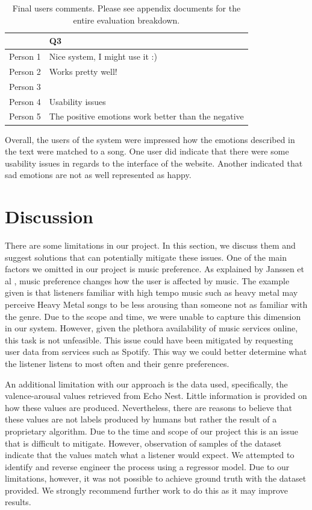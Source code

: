 \documentclass[10pt,journal,compsoc]{IEEEtran}
\begin{document}
		\begin{table}[]
			\centering
			\caption{Final users comments. Please see appendix documents for the entire evaluation breakdown.}
			\begin{tabular}{|c|p{6cm}|}
				\hline
				& Q3 \\ \hline
				Person 1 & Nice system, I might use it :) \\
				Person 2 & Works pretty well! \\
				Person 3 & \\
				Person 4 & Usability issues \\
				Person 5 & The positive emotions work better than the negative \\
				\hline
			\end{tabular}
			\label{tb:comments}
		\end{table}
		
		Overall, the users of the system were impressed how the emotions described in the text were matched to a song. One user did indicate that there were some usability issues in regards to the interface of the website. Another indicated that sad emotions are not as well represented as happy.
	
	\section{Discussion}
	
	There are some limitations in our project. In this section, we discuss them and suggest solutions that can potentially mitigate these issues. One of the main factors we omitted in our project is music preference. As explained by Janssen et al \cite{Janssen}, music preference changes how the user is affected by music. The example given is that listeners familiar with high tempo music such as heavy metal may perceive Heavy Metal songs to be less arousing than someone not as familiar with the genre. Due to the scope and time, we were unable to capture this dimension in our system. However, given the plethora availability of music services online, this task is not unfeasible. This issue could have been mitigated by requesting user data from services such as Spotify. This way we could better determine what the listener listens to most often and their genre preferences. 
	
	An additional limitation with our approach is the data used, specifically, the valence-arousal values retrieved from Echo Nest. Little information is provided on how these values are produced. Nevertheless, there are reasons to believe that these values are not labels produced by humans but rather the result of a proprietary algorithm. Due to the time and scope of our project this is an issue that is difficult to mitigate. However, observation of samples of the dataset indicate that the values match what a listener would expect. We attempted to identify and reverse engineer the process using a  regressor model. Due to our limitations, however, it was not possible to achieve ground truth with the dataset provided. We strongly recommend further work to do this as it may improve results.
	
\end{document}
